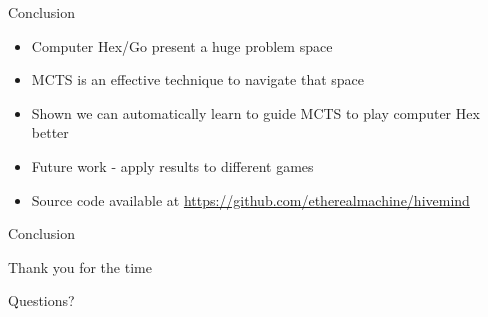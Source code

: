 \documentclass{beamer}
\begin{document}
\begin{frame}{Conclusion}
\begin{itemize}
	\item Computer Hex/Go present a huge problem space
	\item MCTS is an effective technique to navigate that space
	\item Shown we can automatically learn to guide MCTS to play computer Hex better
	\item Future work - apply results to different games
	\item Source code available at \url{https://github.com/etherealmachine/hivemind}
\end{itemize}
\end{frame}

\begin{frame}{Conclusion}
\centerline{Thank you for the time}
\centerline{Questions?}
\end{frame}
\end{document}
